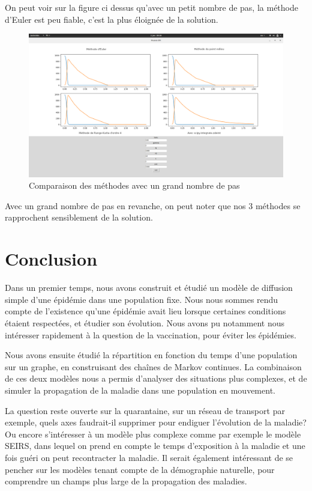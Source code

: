 \documentclass[a4paper]{article}
\theoremstyle{plain}
\theoremstyle{definition}
\theoremstyle{remark}
\begin{document}
On peut voir sur la figure ci dessus qu'avec un petit nombre de pas, la méthode d'Euler est peu fiable, c'est la plus éloignée de la solution.
\begin{figure}[h!]
    \centering
    \includegraphics{comp1.png}
    \caption{Comparaison des méthodes avec un grand nombre de pas}
\end{figure}{}

Avec un grand nombre de pas en revanche, on peut noter que nos 3 méthodes se rapprochent sensiblement de la solution.


\section{Conclusion}
Dans un premier temps, nous avons construit et étudié un modèle de diffusion simple d'une épidémie dans une population fixe. Nous nous sommes rendu compte de l'existence qu'une épidémie avait lieu lorsque certaines conditions étaient respectées, et étudier son évolution. Nous avons pu notamment nous intéresser rapidement à la question de la vaccination, pour éviter les épidémies.

Nous avons ensuite étudié la répartition en fonction du temps d'une population sur un graphe, en construisant des chaînes de Markov continues.
La combinaison de ces deux modèles nous a permis d'analyser des situations plus complexes, et de simuler la propagation de la maladie dans une population en mouvement.

La question reste ouverte sur la quarantaine, sur un réseau de transport par exemple, quels axes faudrait-il supprimer pour endiguer l'évolution de la maladie? Ou encore s'intéresser à un modèle plus complexe comme par exemple le modèle SEIRS, dans lequel on prend en compte le temps d'exposition à la maladie et une fois guéri on peut recontracter la maladie. Il serait également intéressant de se pencher sur les modèles tenant compte de la démographie naturelle, pour comprendre un champs plus large de la propagation des maladies.
\end{document}
